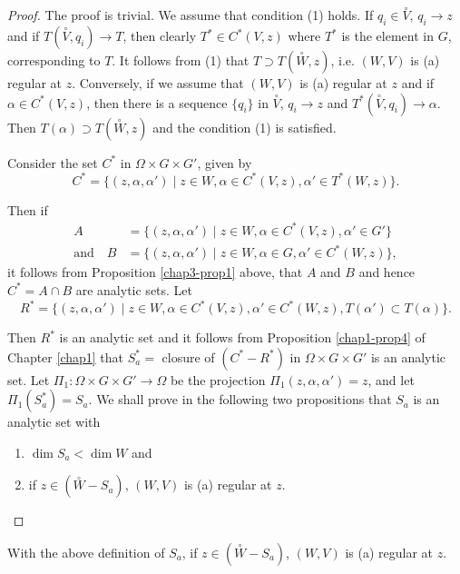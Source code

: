\begin{proof} %
  The proof is trivial. We assume that condition (1) holds. If $q_i
  \in \overset{\circ}{V}$, $q_i\to z$ and if
  $T(\overset{\circ}{V}, q_i) \to T$, then clearly $T^* \in C^*
  (V,z)$ where $T^*$ is the element in $G$, corresponding to $T$. It
  follows from (1) that $T\supset T(\overset{\circ}{W}, z)$,
  i.e. $(W,V)$ is (a) regular at $z$. Conversely, if we assume that
  $(W,V)$ is (a) regular at $z$ and if $\alpha \in C^*(V,z)$,
  then there is a sequence $\{q_i\}$ in
  $\overset{\circ}{V}$, $q_i \to z$ and
  $T^*(\overset{\circ}{V},q_i)\to \alpha$. Then
  $T(\alpha)\supset T(\overset{\circ}{W},z)$ and the condition (1)
  is satisfied. 

Consider the set $C^*$ in $\Omega \times G \times G'$, given by 
$$
C^*=\bigg\{(z,\alpha,\alpha')\mid z\in W, \alpha \in C^*(V,z),
\alpha'\in T^*(W,z)\bigg\}.
$$ 

Then if  
\begin{align*}
  A & = \bigg\{(z,\alpha,\alpha')\mid z\in W, \alpha \in
  C^*(V,z), \alpha' \in G'\bigg\} \\
\text{and}\quad  B & = \bigg\{(z,\alpha,\alpha')\mid z\in
W, \alpha \in G,  \alpha' \in C^*(W,z)\bigg\}, 
\end{align*}\pageoriginale
it follows from Proposition \ref{chap3-prop1} above, that $A$ and $B$
and hence $C^* = 
A \cap B $ are analytic sets. Let  
$$
R^* = \bigg\{(z,\alpha,\alpha')\mid z \in W, \alpha \in
C^*(V,z), \alpha'\in C^*(W,z),T(\alpha')\subset
T(\alpha)\bigg\}. 
$$

Then $R^*$ is an analytic set and it follows from Proposition
\ref{chap1-prop4} of 
Chapter \ref{chap1} that $S^*_a =$ closure of $(C^*-R^*)$ in $\Omega \times G
\times G'$ is an analytic set. Let $\Pi_1:\Omega \times G \times
G'\to \Omega$ be the projection $\Pi_1 (z,\alpha,\alpha') =
z$, and let $\Pi_1 (S^*_a) = S_a$. We shall prove in the following two
propositions that $S_a$ is an analytic set with  
\begin{enumerate}[\rm(1)]
\item $\dim S_a < \dim W$ and
\item if $z\in(\overset{\circ}{W}-S_a)$, $(W,V)$ is (a) regular
  at $z$. 
\end{enumerate}
\end{proof}

\begin{proposition} %
With the above definition of $S_a$, if $z\in(\overset{\circ}{W}-S_a)$,
$(W,V)$ is (a) regular at $z$.  
\end{proposition}

